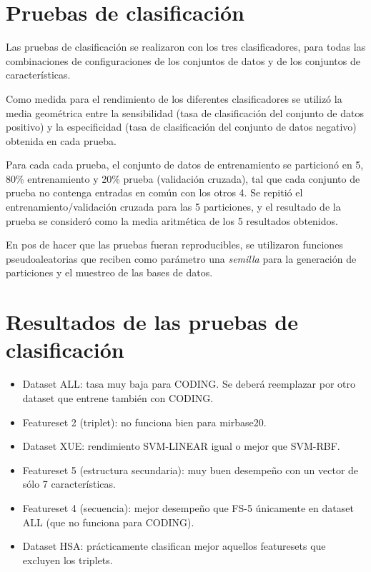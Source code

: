 \documentclass[12pt,bibliography=oldstyle,DIV=12,parskip=half-,titlepage]{scrartcl}
\begin{document}
\section{Pruebas de clasificación}

Las pruebas de clasificación se realizaron con los tres
clasificadores, para todas las combinaciones de configuraciones de los
conjuntos de datos y de los conjuntos de características.

Como medida para el rendimiento de los diferentes clasificadores se
utilizó la media geométrica entre la sensibilidad (tasa de
clasificación del conjunto de datos positivo) y la especificidad (tasa
de clasificación del conjunto de datos negativo) obtenida en cada
prueba.

Para cada cada prueba, el conjunto de datos de entrenamiento se
particionó en 5, 80\% entrenamiento y 20\% prueba (validación
cruzada), tal que cada conjunto de prueba no contenga entradas en
común con los otros 4. Se repitió el entrenamiento/validación cruzada
para las 5 particiones, y el resultado de la prueba se consideró como
la media aritmética de los 5 resultados obtenidos.

En pos de hacer que las pruebas fueran reproducibles, se utilizaron funciones pseudoaleatorias
que reciben como parámetro una \emph{semilla} para la generación de particiones
y el muestreo de las bases de datos. 


\section{Resultados de las pruebas de clasificación}
\begin{itemize}
\item Dataset ALL: tasa muy baja para CODING. Se deberá reemplazar por otro dataset que entrene también con CODING.
\item Featureset 2 (triplet): no funciona bien para mirbase20.
\item Dataset XUE: rendimiento SVM-LINEAR igual o mejor que SVM-RBF.
\item Featureset 5 (estructura secundaria): muy buen desempeño con un vector de sólo 7 características.
\item Featureset 4 (secuencia): mejor desempeño que FS-5 únicamente en dataset ALL (que no funciona para CODING).
\item Dataset HSA: prácticamente clasifican mejor aquellos featuresets que excluyen los triplets.
\end{itemize}

\renewcommand{\bibfont}{\normalfont\footnotesize}
\printbibliography
\end{document}
